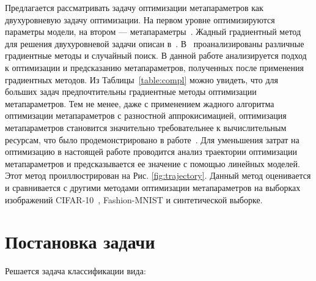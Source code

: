 \documentclass[12pt]{a&t}
\begin{document}
Предлагается рассматривать задачу оптимизации метапараметров как двухуровневую задачу оптимизации. На первом уровне оптимизируются параметры модели, на втором --- метапараметры~\cite{journals/corr/LuketinaBR15,journals/anor/BakhteevS20,journals/corr/MaclaurinDA15}. Жадный градиентный метод для решения двухуровневой задачи описан в~\cite{journals/corr/LuketinaBR15}. В~\cite{journals/anor/BakhteevS20} проанализированы различные градиентные методы и случайный поиск. 
В данной работе анализируется подход к оптимизации и предсказанию метапараметров, полученных после применения градиентных методов. Из Таблицы~\ref{table:compl} можно увидеть, что для больших задач предпочтительны градиентные методы оптимизации метапараметров. Тем не менее, даже с применением жадного алгоритма оптимизации метапараметров с разностной аппрокисимацией, оптимизация метапараметров становится значительно требовательнее к вычислительным ресурсам, что было продемонстрировано в работе~\cite{liu2018darts}. Для уменьшения затрат на оптимизацию в настоящей работе проводится анализ траектории оптимизации метапараметров и предсказывается ее значение с помощью линейных моделей. Этот метод проиллюстрирован на Рис. \ref{fig:trajectory}. Данный метод оценивается и сравнивается с другими методами оптимизации метапараметров на выборках изображений CIFAR-10~\cite{krizhevsky2009learning}, Fashion-MNIST \cite{journals/corr/abs-1708-07747} и синтетической выборке. 

    
    

\section{Постановка задачи}

Решается задача классификации вида:
\end{document}
